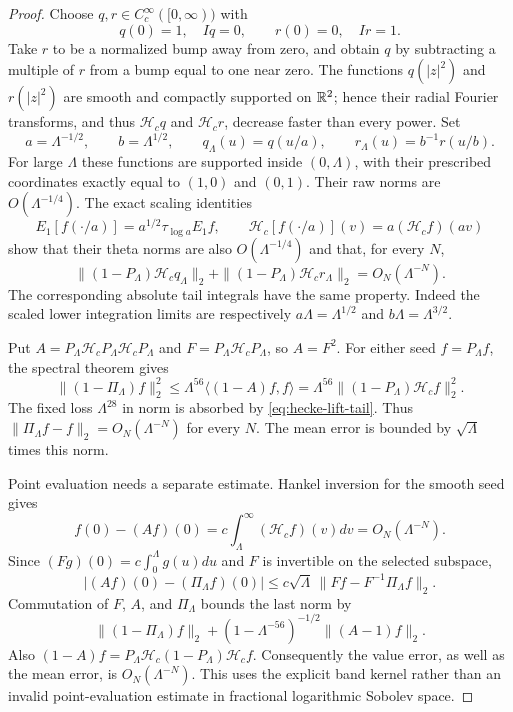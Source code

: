 \begin{proof}
Choose $q,r\in C_c^\infty([0,\infty))$ with
\[
 q(0)=1,\quad Iq=0,\qquad r(0)=0,\quad Ir=1.
\]
Take $r$ to be a normalized bump away from zero, and obtain $q$
by subtracting a multiple of $r$ from a bump equal to one near zero.
The functions $q(|z|^2)$ and $r(|z|^2)$ are smooth and compactly
supported on $\mathbb R^2$; hence their radial Fourier transforms, and thus
$\mathcal H_cq$ and $\mathcal H_cr$, decrease faster than every power.
Set
\[
 a=\Lambda^{-1/2},\qquad b=\Lambda^{1/2},\qquad
 q_\Lambda(u)=q(u/a),\qquad r_\Lambda(u)=b^{-1}r(u/b).
\]
For large $\Lambda$ these functions are supported inside $(0,\Lambda)$,
with their prescribed coordinates exactly equal to $(1,0)$ and $(0,1)$.
Their raw norms are $O(\Lambda^{-1/4})$. The exact scaling identities
\[
 E_1[f(\cdot/a)]=a^{1/2}\tau_{\log a}E_1f,
 \qquad
 \mathcal H_c[f(\cdot/a)](v)=a(\mathcal H_cf)(av)
\]
show that their theta norms are also $O(\Lambda^{-1/4})$ and that,
for every $N$,
\begin{equation}\label{eq:hecke-lift-tail}
 \|(1-P_\Lambda)\mathcal H_cq_\Lambda\|_2+
 \|(1-P_\Lambda)\mathcal H_cr_\Lambda\|_2
                                  =O_N(\Lambda^{-N}).
\end{equation}
The corresponding absolute tail integrals have the same property.
Indeed the scaled lower integration limits are respectively
$a\Lambda=\Lambda^{1/2}$ and $b\Lambda=\Lambda^{3/2}$.

Put $A=P_\Lambda\mathcal H_cP_\Lambda\mathcal H_cP_\Lambda$
and $F=P_\Lambda\mathcal H_cP_\Lambda$, so $A=F^2$. For either
seed $f=P_\Lambda f$, the spectral theorem gives
\[
 \|(1-\Pi_\Lambda)f\|_2^2
 \leq\Lambda^{56}\langle(1-A)f,f\rangle
 =\Lambda^{56}\|(1-P_\Lambda)\mathcal H_cf\|_2^2.
\]
The fixed loss $\Lambda^{28}$ in norm is absorbed by
\eqref{eq:hecke-lift-tail}. Thus
$\|\Pi_\Lambda f-f\|_2=O_N(\Lambda^{-N})$ for every $N$.
The mean error is bounded by $\sqrt\Lambda$ times this norm.

Point evaluation needs a separate estimate. Hankel inversion for the
smooth seed gives
\[
 f(0)-(Af)(0)=c\int_\Lambda^\infty(\mathcal H_cf)(v)dv
                                           =O_N(\Lambda^{-N}).
\]
Since $(Fg)(0)=c\int_0^\Lambda g(u)du$ and $F$ is invertible on
the selected subspace,
\[
 |(Af)(0)-(\Pi_\Lambda f)(0)|
 \leq c\sqrt\Lambda\,
                 \|Ff-F^{-1}\Pi_\Lambda f\|_2.
\]
Commutation of $F$, $A$, and $\Pi_\Lambda$ bounds the last norm by
\[
 \|(1-\Pi_\Lambda)f\|_2+
 (1-\Lambda^{-56})^{-1/2}\|(A-1)f\|_2.
\]
Also $(1-A)f=P_\Lambda\mathcal H_c(1-P_\Lambda)\mathcal H_cf$.
Consequently the value error, as well as the mean error, is
$O_N(\Lambda^{-N})$. This uses the explicit band kernel rather than
an invalid point-evaluation estimate in fractional logarithmic Sobolev
space.


\end{proof}
